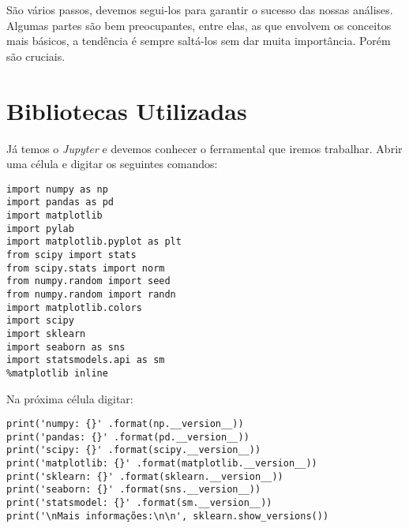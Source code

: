 São vários passos, devemos segui-los para garantir o sucesso das nossas análises. Algumas partes são bem preocupantes, entre elas, as que envolvem os conceitos mais básicos, a tendência é sempre saltá-los sem dar muita importância. Porém são cruciais.

\section{Bibliotecas Utilizadas}
Já temos o \textit{Jupyter} e devemos conhecer o ferramental que iremos trabalhar. Abrir uma célula e digitar os seguintes comandos:
\begin{lstlisting}
import numpy as np
import pandas as pd
import matplotlib
import pylab
import matplotlib.pyplot as plt
from scipy import stats
from scipy.stats import norm
from numpy.random import seed
from numpy.random import randn
import matplotlib.colors
import scipy
import sklearn
import seaborn as sns
import statsmodels.api as sm
%matplotlib inline
\end{lstlisting}

Na próxima célula digitar:
\begin{lstlisting}
print('numpy: {}' .format(np.__version__))
print('pandas: {}' .format(pd.__version__))
print('scipy: {}' .format(scipy.__version__))
print('matplotlib: {}' .format(matplotlib.__version__))
print('sklearn: {}' .format(sklearn.__version__))
print('seaborn: {}' .format(sns.__version__))
print('statsmodel: {}' .format(sm.__version__))
print('\nMais informações:\n\n', sklearn.show_versions())
\end{lstlisting}

